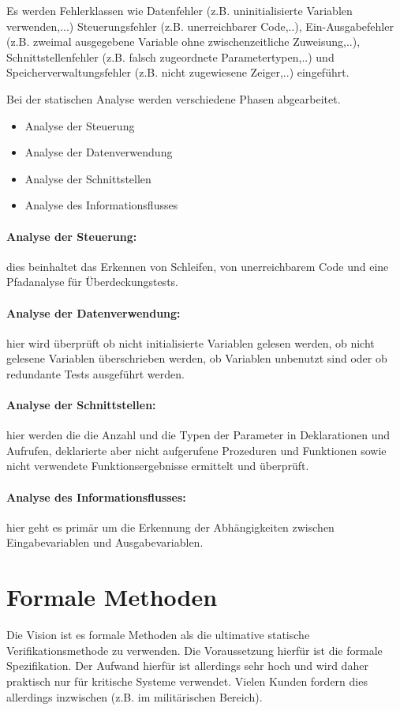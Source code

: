 Es werden Fehlerklassen wie Datenfehler (z.B. uninitialisierte Variablen verwenden,...) Steuerungsfehler (z.B. unerreichbarer Code,..), Ein-Ausgabefehler (z.B. zweimal ausgegebene Variable ohne zwischenzeitliche Zuweisung,..), Schnittstellenfehler (z.B. falsch zugeordnete Parametertypen,..) und Speicherverwaltungsfehler (z.B. nicht zugewiesene Zeiger,..) eingeführt.

Bei der statischen Analyse werden verschiedene Phasen abgearbeitet. 
\begin{itemize}
\item Analyse der Steuerung
\item Analyse der Datenverwendung
\item Analyse der Schnittstellen
\item Analyse des Informationsflusses
\end{itemize}

\paragraph{Analyse der Steuerung:} dies beinhaltet das Erkennen von Schleifen, von unerreichbarem Code  und eine Pfadanalyse für Überdeckungstests.

\paragraph{Analyse der Datenverwendung:} hier wird überprüft ob nicht initialisierte Variablen gelesen werden, ob nicht gelesene Variablen überschrieben werden, ob Variablen unbenutzt sind oder ob redundante Tests ausgeführt werden.

\paragraph{Analyse der Schnittstellen:} hier werden die die Anzahl und die Typen der Parameter in Deklarationen und Aufrufen, deklarierte aber nicht aufgerufene Prozeduren und Funktionen sowie nicht verwendete Funktionsergebnisse ermittelt und überprüft.

\paragraph{Analyse des Informationsflusses:} hier geht es primär um die Erkennung der Abhängigkeiten zwischen Eingabevariablen und Ausgabevariablen.

\section{Formale Methoden}
Die Vision ist es formale Methoden als die ultimative statische Verifikationsmethode zu verwenden.
Die Voraussetzung hierfür ist die formale Spezifikation. Der Aufwand hierfür ist allerdings sehr hoch und wird daher praktisch nur für kritische Systeme verwendet. Vielen Kunden fordern dies allerdings inzwischen (z.B. im militärischen Bereich). 

